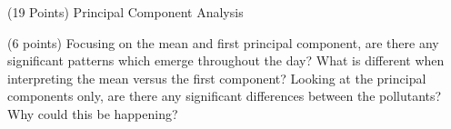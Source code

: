 \documentclass[12pt]{article}
\begin{document}
\begin{question}{(19 Points) Principal Component Analysis}
\begin{subquestion}



\end{subquestion}

\begin{subquestion}{(6 points) Focusing on the mean and first principal component, are there any significant patterns which emerge throughout the day?  What is different when interpreting the mean versus the first component?  Looking at the principal components only, are there any significant differences between the pollutants? Why could this be happening? }






\end{subquestion}

\end{question}

\end{document}
